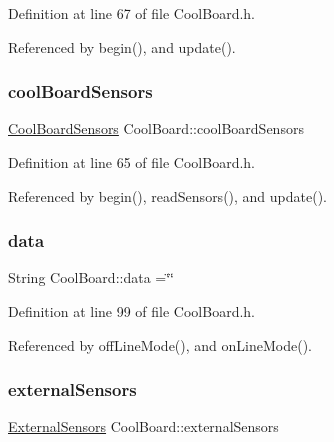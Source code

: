 Definition at line 67 of file Cool\+Board.\+h.



Referenced by begin(), and update().

\mbox{\label{classCoolBoard_af102be5288bd7f7a8e59b13f86e26a00}} 
\subsubsection{\texorpdfstring{cool\+Board\+Sensors}{coolBoardSensors}}
{\footnotesize\ttfamily \hyperlink{classCoolBoardSensors}{Cool\+Board\+Sensors} Cool\+Board\+::cool\+Board\+Sensors\hspace{0.3cm}{\ttfamily [private]}}



Definition at line 65 of file Cool\+Board.\+h.



Referenced by begin(), read\+Sensors(), and update().

\mbox{\label{classCoolBoard_a427fb753dd8575bdf821c70a5c63d695}} 
\subsubsection{\texorpdfstring{data}{data}}
{\footnotesize\ttfamily String Cool\+Board\+::data =\char`\"{}\char`\"{}\hspace{0.3cm}{\ttfamily [private]}}



Definition at line 99 of file Cool\+Board.\+h.



Referenced by off\+Line\+Mode(), and on\+Line\+Mode().

\mbox{\label{classCoolBoard_a09e26264839c65873eb56af476eff6b2}} 
\subsubsection{\texorpdfstring{external\+Sensors}{externalSensors}}
{\footnotesize\ttfamily \hyperlink{classExternalSensors}{External\+Sensors} Cool\+Board\+::external\+Sensors\hspace{0.3cm}{\ttfamily [private]}}



